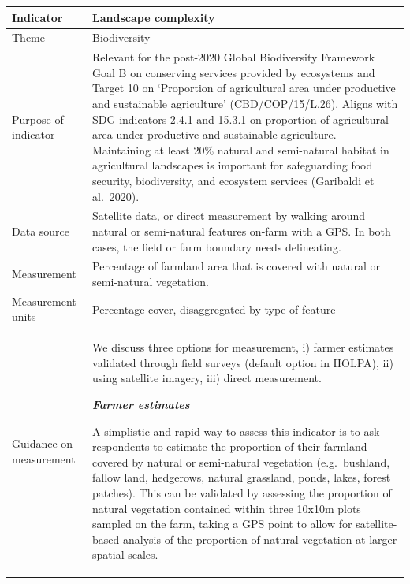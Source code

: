 \documentclass[
  letterpaper,
  DIV=11,
  numbers=noendperiod]{scrreprt}
\begin{document}
\begin{longtable}[]{@{}
  >{\raggedright\arraybackslash}p{}
  >{\raggedright\arraybackslash}p{}@{}}
\toprule\noalign{}
\begin{minipage}[b]{\linewidth}\raggedright
\textbf{Indicator}
\end{minipage} & \begin{minipage}[b]{\linewidth}\raggedright
\textbf{Landscape complexity}
\end{minipage} \\
\midrule\noalign{}
\endhead
\bottomrule\noalign{}
\endlastfoot
Theme & Biodiversity \\
Purpose of indicator & Relevant for the post-2020 Global Biodiversity
Framework Goal B on conserving services provided by ecosystems and
Target 10 on `Proportion of agricultural area under productive and
sustainable agriculture' (CBD/COP/15/L.26). Aligns with SDG indicators
2.4.1 and 15.3.1 on proportion of agricultural area under productive and
sustainable agriculture. Maintaining at least 20\% natural and
semi-natural habitat in agricultural landscapes is important for
safeguarding food security, biodiversity, and ecosystem services
(Garibaldi et al.~2020). \\
Data source & Satellite data, or direct measurement by walking around
natural or semi-natural features on-farm with a GPS. In both cases, the
field or farm boundary needs delineating. \\
Measurement & Percentage of farmland area that is covered with natural
or semi-natural vegetation. \\
Measurement units & Percentage cover, disaggregated by type of
feature \\
Guidance on measurement & \begin{minipage}[t]{\linewidth}\raggedright
We discuss three options for measurement, i) farmer estimates validated
through field surveys (default option in HOLPA), ii) using satellite
imagery, iii) direct measurement.

\textbf{\emph{Farmer estimates}}

A simplistic and rapid way to assess this indicator is to ask
respondents to estimate the proportion of their farmland covered by
natural or semi-natural vegetation (e.g.~bushland, fallow land,
hedgerows, natural grassland, ponds, lakes, forest patches). This can be
validated by assessing the proportion of natural vegetation contained
within three 10x10m plots sampled on the farm, taking a GPS point to
allow for satellite-based analysis of the proportion of natural
vegetation at larger spatial scales.


\end{minipage}
\end{longtable}
\end{document}
